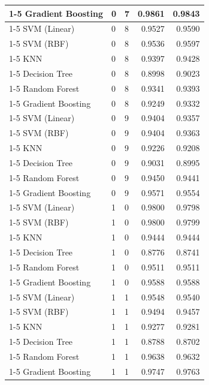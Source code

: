 \begin{table}
\begin{tabular}{lllrr}
\cline{1-5} \cline{2-5}
Gradient Boosting & 0 & 7 & 0.9861 & 0.9843 \\
\cline{1-5} \cline{2-5}
SVM (Linear) & 0 & 8 & 0.9527 & 0.9590 \\
\cline{1-5} \cline{2-5}
SVM (RBF) & 0 & 8 & 0.9536 & 0.9597 \\
\cline{1-5} \cline{2-5}
KNN & 0 & 8 & 0.9397 & 0.9428 \\
\cline{1-5} \cline{2-5}
Decision Tree & 0 & 8 & 0.8998 & 0.9023 \\
\cline{1-5} \cline{2-5}
Random Forest & 0 & 8 & 0.9341 & 0.9393 \\
\cline{1-5} \cline{2-5}
Gradient Boosting & 0 & 8 & 0.9249 & 0.9332 \\
\cline{1-5} \cline{2-5}
SVM (Linear) & 0 & 9 & 0.9404 & 0.9357 \\
\cline{1-5} \cline{2-5}
SVM (RBF) & 0 & 9 & 0.9404 & 0.9363 \\
\cline{1-5} \cline{2-5}
KNN & 0 & 9 & 0.9226 & 0.9208 \\
\cline{1-5} \cline{2-5}
Decision Tree & 0 & 9 & 0.9031 & 0.8995 \\
\cline{1-5} \cline{2-5}
Random Forest & 0 & 9 & 0.9450 & 0.9441 \\
\cline{1-5} \cline{2-5}
Gradient Boosting & 0 & 9 & 0.9571 & 0.9554 \\
\cline{1-5} \cline{2-5}
SVM (Linear) & 1 & 0 & 0.9800 & 0.9798 \\
\cline{1-5} \cline{2-5}
SVM (RBF) & 1 & 0 & 0.9800 & 0.9799 \\
\cline{1-5} \cline{2-5}
KNN & 1 & 0 & 0.9444 & 0.9444 \\
\cline{1-5} \cline{2-5}
Decision Tree & 1 & 0 & 0.8776 & 0.8741 \\
\cline{1-5} \cline{2-5}
Random Forest & 1 & 0 & 0.9511 & 0.9511 \\
\cline{1-5} \cline{2-5}
Gradient Boosting & 1 & 0 & 0.9588 & 0.9588 \\
\cline{1-5} \cline{2-5}
SVM (Linear) & 1 & 1 & 0.9548 & 0.9540 \\
\cline{1-5} \cline{2-5}
SVM (RBF) & 1 & 1 & 0.9494 & 0.9457 \\
\cline{1-5} \cline{2-5}
KNN & 1 & 1 & 0.9277 & 0.9281 \\
\cline{1-5} \cline{2-5}
Decision Tree & 1 & 1 & 0.8788 & 0.8702 \\
\cline{1-5} \cline{2-5}
Random Forest & 1 & 1 & 0.9638 & 0.9632 \\
\cline{1-5} \cline{2-5}
Gradient Boosting & 1 & 1 & 0.9747 & 0.9763 \\

\end{tabular}
\end{table}
